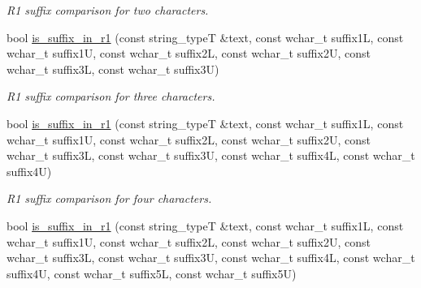 \begin{DoxyCompactItemize}
\begin{DoxyCompactList}\small\item\em R1 suffix comparison for two characters. \end{DoxyCompactList}\item 
\hypertarget{group___stemming_ga1fe4a63adfa5d4f378a060352d52edc1}{bool \hyperlink{group___stemming_ga1fe4a63adfa5d4f378a060352d52edc1}{is\-\_\-suffix\-\_\-in\-\_\-r1} (const string\-\_\-type\-T \&text, const wchar\-\_\-t suffix1\-L, const wchar\-\_\-t suffix1\-U, const wchar\-\_\-t suffix2\-L, const wchar\-\_\-t suffix2\-U, const wchar\-\_\-t suffix3\-L, const wchar\-\_\-t suffix3\-U)}\label{group___stemming_ga1fe4a63adfa5d4f378a060352d52edc1}

\begin{DoxyCompactList}\small\item\em R1 suffix comparison for three characters. \end{DoxyCompactList}\item 
\hypertarget{group___stemming_ga3fef2f8916933fa1965928f8e43a1b58}{bool \hyperlink{group___stemming_ga3fef2f8916933fa1965928f8e43a1b58}{is\-\_\-suffix\-\_\-in\-\_\-r1} (const string\-\_\-type\-T \&text, const wchar\-\_\-t suffix1\-L, const wchar\-\_\-t suffix1\-U, const wchar\-\_\-t suffix2\-L, const wchar\-\_\-t suffix2\-U, const wchar\-\_\-t suffix3\-L, const wchar\-\_\-t suffix3\-U, const wchar\-\_\-t suffix4\-L, const wchar\-\_\-t suffix4\-U)}\label{group___stemming_ga3fef2f8916933fa1965928f8e43a1b58}

\begin{DoxyCompactList}\small\item\em R1 suffix comparison for four characters. \end{DoxyCompactList}\item 
\hypertarget{group___stemming_ga88f0e5e0cc055f013b6321215eb18ef3}{bool \hyperlink{group___stemming_ga88f0e5e0cc055f013b6321215eb18ef3}{is\-\_\-suffix\-\_\-in\-\_\-r1} (const string\-\_\-type\-T \&text, const wchar\-\_\-t suffix1\-L, const wchar\-\_\-t suffix1\-U, const wchar\-\_\-t suffix2\-L, const wchar\-\_\-t suffix2\-U, const wchar\-\_\-t suffix3\-L, const wchar\-\_\-t suffix3\-U, const wchar\-\_\-t suffix4\-L, const wchar\-\_\-t suffix4\-U, const wchar\-\_\-t suffix5\-L, const wchar\-\_\-t suffix5\-U)}\label{group___stemming_ga88f0e5e0cc055f013b6321215eb18ef3}


\end{DoxyCompactItemize}
